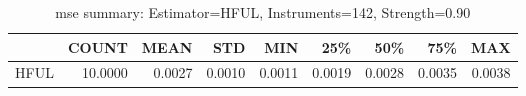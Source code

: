 \begin{table}[ht]
\centering
\caption{mse summary: Estimator=HFUL, Instruments=142, Strength=0.90}
\begin{tabular}{lrrrrrrrr}
\toprule
 & COUNT & MEAN & STD & MIN & 25\% & 50\% & 75\% & MAX \\
\midrule
HFUL & 10.0000 & 0.0027 & 0.0010 & 0.0011 & 0.0019 & 0.0028 & 0.0035 & 0.0038 \\
\bottomrule
\end{tabular}
\end{table}

